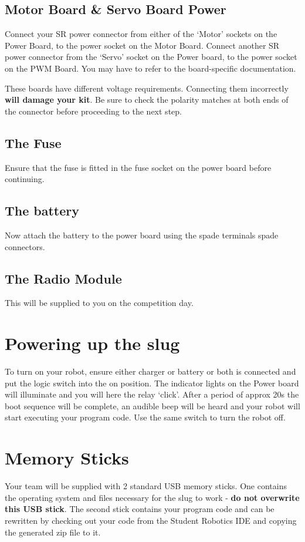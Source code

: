 \documentclass[a4paper, 12pt]{article}
\begin{document}
\subsection{Motor Board \& Servo Board Power}
Connect your SR power connector from either of the `Motor' sockets on the Power Board, to the power socket on the Motor Board. Connect another SR power connector from the `Servo' socket on the Power board, to the power socket on the PWM Board. You may have to refer to the board-specific documentation. 

These boards have different voltage requirements. Connecting them incorrectly \textbf{will damage your kit}. Be sure to check the polarity matches at both ends of the connector before proceeding to the next step.

\subsection{The Fuse}
Ensure that the fuse is fitted in the fuse socket on the power board before continuing.

\subsection{The battery}
Now attach the battery to the power board using the spade terminals spade connectors. 

\subsection{The Radio Module}
This will be supplied to you on the competition day.

\section{Powering up the slug}
To turn on your robot, ensure either charger or battery or both is connected and put the logic switch into the on position. The indicator lights on the Power board will illuminate and you will here the relay `click'. After a period of approx 20s the boot sequence will be complete, an audible beep will be heard and your robot will start executing your program code. Use the same switch to turn the robot off. 

\section{Memory Sticks}
Your team will be supplied with 2 standard USB memory sticks. One contains the operating system and files necessary for the slug to work - \textbf{do not overwrite this USB stick}. The second stick contains your program code and can be rewritten by checking out your code from the Student Robotics IDE and copying the generated zip file to it.
\end{document}

